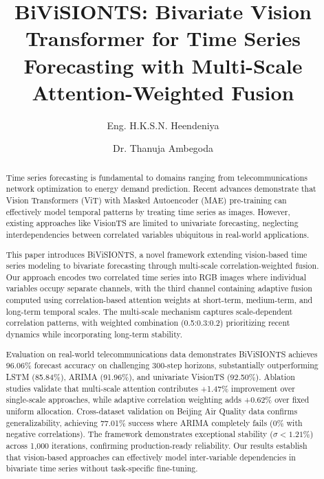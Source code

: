 \documentclass[preprint,12pt,authoryear]{elsarticle}
\begin{document}
\begin{frontmatter}

\title{BiViSIONTS: Bivariate Vision Transformer for Time Series Forecasting with Multi-Scale Attention-Weighted Fusion}

\author[uom]{Eng. H.K.S.N. Heendeniya}

\author[uom]{Dr. Thanuja Ambegoda}



\begin{abstract}
Time series forecasting is fundamental to domains ranging from telecommunications network optimization to energy demand prediction. Recent advances demonstrate that Vision Transformers (ViT) with Masked Autoencoder (MAE) pre-training can effectively model temporal patterns by treating time series as images. However, existing approaches like VisionTS are limited to univariate forecasting, neglecting interdependencies between correlated variables ubiquitous in real-world applications.

This paper introduces BiViSIONTS, a novel framework extending vision-based time series modeling to bivariate forecasting through multi-scale correlation-weighted fusion. Our approach encodes two correlated time series into RGB images where individual variables occupy separate channels, with the third channel containing adaptive fusion computed using correlation-based attention weights at short-term, medium-term, and long-term temporal scales. The multi-scale mechanism captures scale-dependent correlation patterns, with weighted combination (0.5:0.3:0.2) prioritizing recent dynamics while incorporating long-term stability.

Evaluation on real-world telecommunications data demonstrates BiViSIONTS achieves 96.06\% forecast accuracy on challenging 300-step horizons, substantially outperforming LSTM (85.84\%), ARIMA (91.96\%), and univariate VisionTS (92.50\%). Ablation studies validate that multi-scale attention contributes +1.47\% improvement over single-scale approaches, while adaptive correlation weighting adds +0.62\% over fixed uniform allocation. Cross-dataset validation on Beijing Air Quality data confirms generalizability, achieving 77.01\% success where ARIMA completely fails (0\% with negative correlations). The framework demonstrates exceptional stability ($\sigma < 1.21\%$) across 1,000 iterations, confirming production-ready reliability. Our results establish that vision-based approaches can effectively model inter-variable dependencies in bivariate time series without task-specific fine-tuning.
\end{abstract}


\end{frontmatter}
\end{document}
